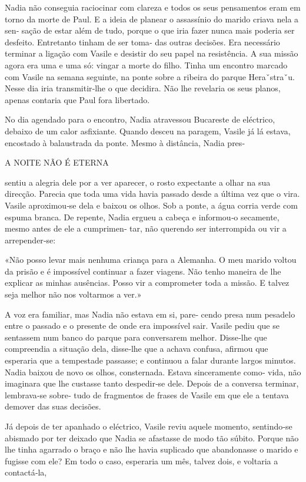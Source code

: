 Nadia não conseguia raciocinar com clareza e todos os seus pensamentos
eram em torno da morte de Paul. E a ideia de planear o assassínio do
marido criava nela a sen‑ sação de estar além de tudo, porque o que iria
fazer nunca mais poderia ser desfeito. Entretanto tinham de ser toma‑
das outras decisões. Era necessário terminar a ligação com Vasile e
desistir do seu papel na resistência. A sua missão agora era uma e uma
só: vingar a morte do filho. Tinha um encontro marcado com Vasile na
semana seguinte, na ponte sobre a ribeira do parque Heraˇstraˇu. Nesse
dia iria transmitir‑lhe o que decidira. Não lhe revelaria os seus
planos, apenas contaria que Paul fora libertado.

No dia agendado para o encontro, Nadia atravessou Bucareste de
eléctrico, debaixo de um calor asfixiante. Quando desceu na paragem,
Vasile já lá estava, encostado à balaustrada da ponte. Mesmo à
distância, Nadia pres‑

A NOITE NÃO É ETERNA

sentiu a alegria dele por a ver aparecer, o rosto expectante a olhar na
sua direcção. Parecia que toda uma vida havia passado desde a última vez
que o vira. Vasile aproximou‑se dela e baixou os olhos. Sob a ponte, a
água corria verde com espuma branca. De repente, Nadia ergueu a cabeça e
informou‑o secamente, mesmo antes de ele a cumprimen‑ tar, não querendo
ser interrompida ou vir a arrepender‑se:

«Não posso levar mais nenhuma criança para a Alemanha. O meu marido
voltou da prisão e é impossível continuar a fazer viagens. Não tenho
maneira de lhe explicar as minhas ausências. Posso vir a comprometer
toda a missão. E talvez seja melhor não nos voltarmos a ver.»

A voz era familiar, mas Nadia não estava em si, pare‑ cendo presa num
pesadelo entre o passado e o presente de onde era impossível sair.
Vasile pediu que se sentassem num banco do parque para conversarem
melhor. Disse‑lhe que compreendia a situação dela, disse‑lhe que a
achava confusa, afirmou que esperaria que a tempestade passasse; e
continuou a falar durante largos minutos. Nadia baixou de novo os olhos,
consternada. Estava sinceramente como‑ vida, não imaginara que lhe
custasse tanto despedir‑se dele. Depois de a conversa terminar,
lembrava‑se sobre‑ tudo de fragmentos de frases de Vasile em que ele a
tentava demover das suas decisões.

Já depois de ter apanhado o eléctrico, Vasile reviu aquele momento,
sentindo‑se abismado por ter deixado que Nadia se afastasse de modo tão
súbito. Porque não lhe tinha agarrado o braço e não lhe havia suplicado
que abandonasse o marido e fugisse com ele? Em todo o caso, esperaria um
mês, talvez dois, e voltaria a contactá‑la,

